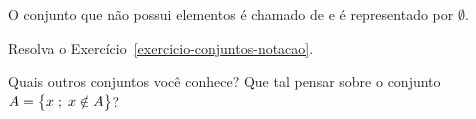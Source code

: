 \begin{definition}
O conjunto que não possui elementos é chamado de  e é representado por $\emptyset$.
\end{definition}

\begin{exercise:ref}
Resolva o Exercício~\ref{exercicio-conjuntos-notacao}.
\end{exercise:ref}

\begin{example}
Quais outros conjuntos você conhece? Que tal pensar sobre o conjunto $A = \left\{x \;;\; x \notin A\right\}$?
\end{example}
